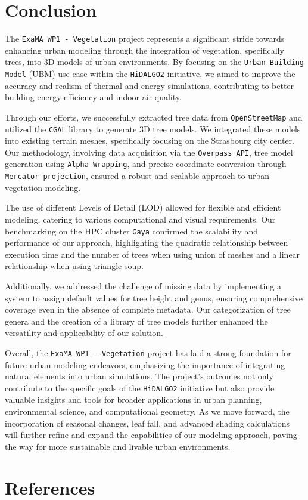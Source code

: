 \documentclass[12pt]{article}
\begin{document}
\newpage

\section{Conclusion}

The \texttt{ExaMA WP1 - Vegetation} project represents a significant stride towards
enhancing urban modeling through the integration of vegetation, specifically
trees, into 3D models of urban environments. By focusing on the \texttt{Urban Building
Model} (UBM) use case within the \texttt{HiDALGO2} initiative, we aimed to improve the
accuracy and realism of thermal and energy simulations, contributing to better
building energy efficiency and indoor air quality.

Through our efforts, we successfully extracted tree data from
\texttt{OpenStreetMap} and utilized the \texttt{CGAL} library to generate 3D
tree models. We integrated these models into existing terrain meshes,
specifically focusing on the Strasbourg city center. Our methodology, involving
data acquisition via the \texttt{Overpass API}, tree model generation using
\texttt{Alpha Wrapping}, and precise coordinate conversion through
\texttt{Mercator projection}, ensured a robust and scalable approach to urban
vegetation modeling.

The use of different Levels of Detail (LOD) allowed for flexible and efficient
modeling, catering to various computational and visual requirements. Our
benchmarking on the HPC cluster \texttt{Gaya} confirmed the scalability and performance
of our approach, highlighting the quadratic relationship between execution time
and the number of trees when using union of meshes and a linear relationship
when using triangle soup.

Additionally, we addressed the challenge of missing data by implementing a
system to assign default values for tree height and genus, ensuring comprehensive
coverage even in the absence of complete metadata. Our categorization of tree
genera and the creation of a library of tree models further enhanced the
versatility and applicability of our solution.

Overall, the \texttt{ExaMA WP1 - Vegetation} project has laid a strong foundation for
future urban modeling endeavors, emphasizing the importance of integrating
natural elements into urban simulations. The project's outcomes not only
contribute to the specific goals of the \texttt{HiDALGO2} initiative but also provide
valuable insights and tools for broader applications in urban planning,
environmental science, and computational geometry. As we move forward, the
incorporation of seasonal changes, leaf fall, and advanced shading calculations
will further refine and expand the capabilities of our modeling approach, paving
the way for more sustainable and livable urban environments.

\newpage

\section{References}


\end{document}
